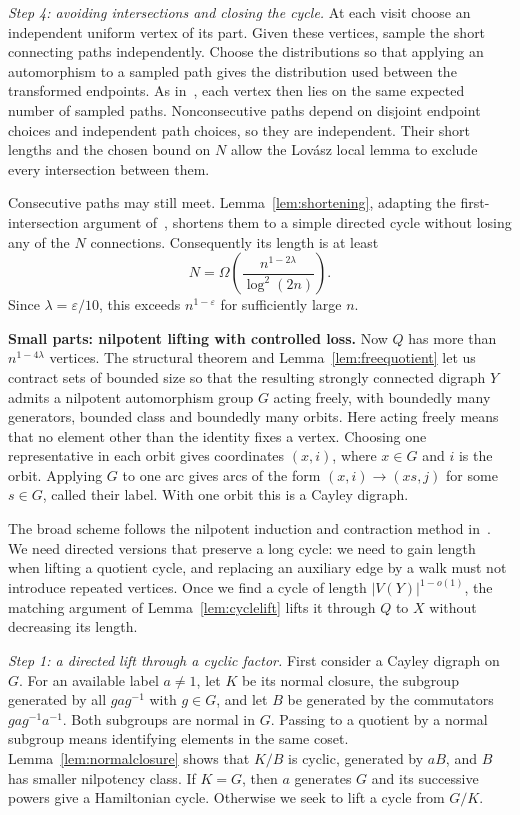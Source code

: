 \documentclass[11pt,a4paper,reqno]{amsart}
\theoremstyle{definition}
\theoremstyle{remark}
\numberwithin{equation}{section}
\newcommand{\eps}{\varepsilon}
\begin{document}
\smallskip
\noindent\emph{Step 4: avoiding intersections and closing the cycle.}
At each visit choose an independent uniform vertex of its part. Given these vertices, sample the short connecting paths independently. Choose the distributions so that applying an automorphism to a sampled path gives the distribution used between the transformed endpoints. As in~\cite[Lemmas 4.5 and 4.6]{LiMethuku}, each vertex then lies on the same expected number of sampled paths. Nonconsecutive paths depend on disjoint endpoint choices and independent path choices, so they are independent. Their short lengths and the chosen bound on $N$ allow the Lov\'asz local lemma to exclude every intersection between them.

Consecutive paths may still meet. Lemma~\ref{lem:shortening}, adapting the first-intersection argument of~\cite[Lemma 2.8]{BHMSY}, shortens them to a simple directed cycle without losing any of the $N$ connections. Consequently its length is at least
\[
 N=\Omega\left(\frac{n^{1-2\lambda}}{\log^2(2n)}\right).
\]
Since $\lambda=\eps/10$, this exceeds $n^{1-\eps}$ for sufficiently large $n$.

\medskip
\noindent\textbf{Small parts: nilpotent lifting with controlled loss.}
Now $Q$ has more than $n^{1-4\lambda}$ vertices. The structural theorem and Lemma~\ref{lem:freequotient} let us contract sets of bounded size so that the resulting strongly connected digraph $Y$ admits a nilpotent automorphism group $G$ acting freely, with boundedly many generators, bounded class and boundedly many orbits. Here acting freely means that no element other than the identity fixes a vertex. Choosing one representative in each orbit gives coordinates $(x,i)$, where $x\in G$ and $i$ is the orbit. Applying $G$ to one arc gives arcs of the form $(x,i)\to(xs,j)$ for some $s\in G$, called their label. With one orbit this is a Cayley digraph.

The broad scheme follows the nilpotent induction and contraction method in~\cite[Sections 6 and 7]{LiMethuku}. We need directed versions that preserve a long cycle: we need to gain length when lifting a quotient cycle, and replacing an auxiliary edge by a walk must not introduce repeated vertices. Once we find a cycle of length $|V(Y)|^{1-o(1)}$, the matching argument of Lemma~\ref{lem:cyclelift} lifts it through $Q$ to $X$ without decreasing its length.

\smallskip
\noindent\emph{Step 1: a directed lift through a cyclic factor.}
First consider a Cayley digraph on $G$. For an available label $a\ne1$, let $K$ be its normal closure, the subgroup generated by all $gag^{-1}$ with $g\in G$, and let $B$ be generated by the commutators $gag^{-1}a^{-1}$. Both subgroups are normal in $G$. Passing to a quotient by a normal subgroup means identifying elements in the same coset. Lemma~\ref{lem:normalclosure} shows that $K/B$ is cyclic, generated by $aB$, and $B$ has smaller nilpotency class. If $K=G$, then $a$ generates $G$ and its successive powers give a Hamiltonian cycle. Otherwise we seek to lift a cycle from $G/K$.
\end{document}
